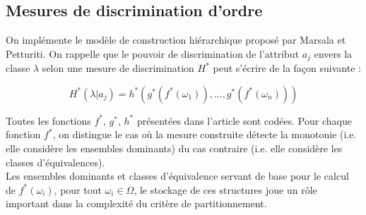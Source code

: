 \documentclass[a4paper]{article}
\begin{document}
%
%
%
%

\subsection{Mesures de discrimination d'ordre} 
On implémente le modèle de
construction hiérarchique proposé par Marsala et Petturiti. On rappelle que le
pouvoir de discrimination de l'attribut $a_j$ envers la classe $\lambda$ selon
une mesure de discrimination $H^*$ peut s'écrire de la façon suivante :

$$ H^*(\lambda | a_j) = h^*(g^*(f^*(\omega_1)),...,g^*(f^*(\omega_n)))$$

\noindent Toutes les fonctions $f^*$, $g^*$, $h^*$ présentées dans l'article
sont codées.  Pour chaque fonction $f^*$, on distingue le cas où la mesure
construite détecte la monotonie (i.e. elle considère les ensembles dominants) du
cas contraire (i.e.  elle considère les classes d'équivalences). \\

Les ensembles dominants et classes d'équivalence servant de base pour le calcul
de $f^*(\omega_i)$, pour tout $\omega_i \in \Omega$, le stockage de ces
structures joue un rôle important dans la complexité du critère de
partitionnement.
\end{document}
